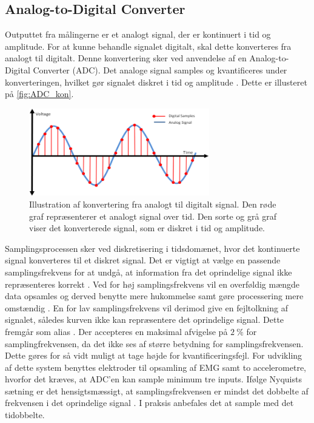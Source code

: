 \subsection{Analog-to-Digital Converter} \label{sec:ADC_teori}
Outputtet fra målingerne er et analogt signal, der er kontinuert i tid og amplitude. 
For at kunne behandle signalet digitalt, skal dette konverteres fra analogt til digitalt. Denne konvertering sker ved anvendelse af en Analog-to-Digital Converter (ADC). 
Det analoge signal samples og kvantificeres under konverteringen, hvilket gør signalet diskret i tid og amplitude \citep{webster1998, morre2003}. 
Dette er illusteret på \autoref{fig:ADC_kon}. 

\begin{figure}[H]
\centering
\includegraphics[width=0.7\textwidth]{figures/problemloesning/adc}
\caption{Illustration af konvertering fra analogt til digitalt signal. Den røde graf repræsenterer et analogt signal over tid. Den sorte og grå graf viser det konverterede signal, som er diskret i tid og amplitude.}
\label{fig:ADC_kon}
\end{figure}

\noindent
Samplingsprocessen sker ved diskretisering i tidsdomænet, hvor det kontinuerte signal konverteres til et diskret signal. 
Det er vigtigt at vælge en passende samplingsfrekvens for at undgå, at information fra det oprindelige signal ikke repræsenteres korrekt \citep{morre2003}. 
Ved for høj samplingsfrekvens vil en overføldig mængde data opsamles og derved benytte mere hukommelse samt gøre processering mere omstændig \citep{wolf2004}. 
En for lav samplingsfrekvens vil derimod give en fejltolkning af signalet, således kurven ikke kan repræsentere det oprindelige signal. Dette fremgår som alias \citep{morre2003}. 
Der accepteres en maksimal afvigelse på $2~\%$ for samplingfrekvensen, da det ikke ses af større betydning for samplingsfrekvensen. 
Dette gøres for så vidt muligt at tage højde for kvantificeringsfejl. 
For udvikling af dette system benyttes elektroder til opsamling af EMG samt to accelerometre, hvorfor det kræves, at ADC'en kan sample minimum tre inputs.
Ifølge Nyquists sætning er det hensigtsmæssigt, at samplingsfrekvensen er mindst det dobbelte af frekvensen i det oprindelige signal \citep{morre2003}. 
I praksis anbefales det at sample med det tidobbelte.

